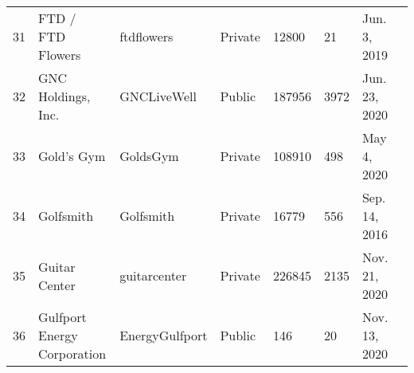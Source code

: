 \documentclass[9pt,twoside,lineno]{pnas-new}
\begin{document}
\begin{longtable}{llllllll}
31          & FTD / FTD Flowers                                                               & ftdflowers                                                          & Private          & 12800              & 21                 & Jun. 3, 2019                                                                                                                          \\
32          & GNC Holdings, Inc.                                                              & GNCLiveWell                                                         & Public           & 187956             & 3972               & Jun. 23, 2020                                                                                                                         \\
33          & Gold's Gym                                                                      & GoldsGym                                                            & Private          & 108910             & 498                & May 4, 2020                                                                                                                           \\
34          & Golfsmith                                                                       & Golfsmith                                                           & Private          & 16779              & 556             & Sep. 14, 2016                                                                                                                    \\
35          & Guitar Center                                                                   & guitarcenter                                                        & Private          & 226845             & 2135               & Nov. 21, 2020                                                                                                                     \\
36          & Gulfport Energy Corporation                                                     & EnergyGulfport                                                      & Public           & 146                & 20                 & Nov. 13, 2020                                                                                                                     \\

\end{longtable}
\end{document}
